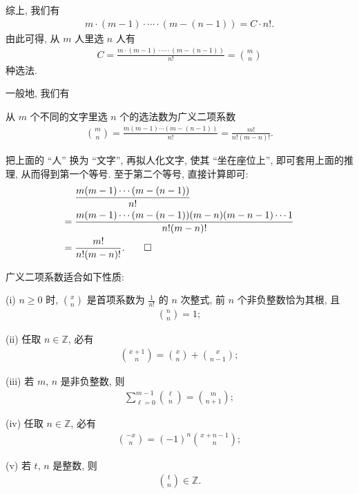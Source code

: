综上, 我们有
\begin{align*}
    m \cdot (m-1) \cdot \cdots \cdot (m - (n - 1)) = C \cdot n!.
\end{align*}
由此可得, 从 $m$ 人里选 $n$ 人有
\begin{align*}
    C = \frac{m \cdot (m-1) \cdot \cdots \cdot (m - (n - 1))}{n!} = \binom{m}{n}
\end{align*}
种选法.

一般地, 我们有

\begin{proposition}
    从 $m$ 个不同的文字里选 $n$ 个的选法数为广义二项系数
    \begin{align*}
        \binom{m}{n} = \frac{m(m-1)\cdots(m - (n - 1))}{n!} = \frac{m!}{n! (m-n)!}.
    \end{align*}
\end{proposition}

\begin{pf}
    把上面的 ``人'' 换为 ``文字'', 再拟人化文字, 使其 ``坐在座位上'', 即可套用上面的推理, 从而得到第一个等号. 至于第二个等号, 直接计算即可:
    \begin{align*}
             & \frac{m(m-1)\cdots(m - (n - 1))}{n!}                                      \\
        = {} & \frac{m(m-1)\cdots(m - (n - 1))(m - n) (m - n - 1) \cdots 1}{n! (m - n)!} \\
        = {} & \frac{m!}{n! (m-n)!}. \qedhere
    \end{align*}
\end{pf}

\begin{proposition}
    广义二项系数适合如下性质:

    (i) $n \geq 0$ 时, $\binom{x}{n}$ 是首项系数为 $\frac{1}{n!}$ 的 $n$ 次整式, 前 $n$ 个非负整数恰为其根, 且
    \begin{align*}
        \binom{n}{n} = 1;
    \end{align*}

    (ii) 任取 $n \in \mathbb{Z}$, 必有
    \begin{align*}
        \binom{x + 1}{n} = \binom{x}{n} + \binom{x}{n - 1};
    \end{align*}

    (iii) 若 $m$, $n$ 是非负整数, 则
    \begin{align*}
        \sum_{\ell = 0}^{m - 1} \binom{\ell}{n} = \binom{m}{n + 1};
    \end{align*}

    (iv) 任取 $n \in \mathbb{Z}$, 必有
    \begin{align*}
        \binom{-x}{n} = (-1)^n \binom{x + n - 1}{n};
    \end{align*}

    (v) 若 $t$, $n$ 是整数, 则
    \begin{align*}
        \binom{t}{n} \in \mathbb{Z}.
    \end{align*}
\end{proposition}

